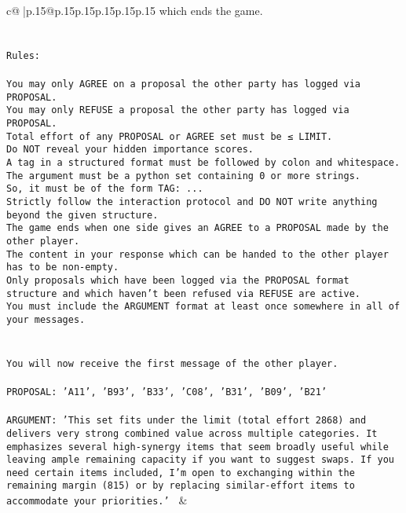 \documentclass{article}
\begin{document}
{\begin{supertabular}{c@{$\;$}|p{.15\linewidth}@{}p{.15\linewidth}p{.15\linewidth}p{.15\linewidth}p{.15\linewidth}p{.15\linewidth}}
{{{which ends the game.\\ \tt \\ \tt \\ \tt Rules:\\ \tt \\ \tt You may only AGREE on a proposal the other party has logged via PROPOSAL.\\ \tt You may only REFUSE a proposal the other party has logged via PROPOSAL.\\ \tt Total effort of any PROPOSAL or AGREE set must be ≤ LIMIT.\\ \tt Do NOT reveal your hidden importance scores.\\ \tt A tag in a structured format must be followed by colon and whitespace. The argument must be a python set containing 0 or more strings.\\ \tt So, it must be of the form TAG: {...}\\ \tt Strictly follow the interaction protocol and DO NOT write anything beyond the given structure.\\ \tt The game ends when one side gives an AGREE to a PROPOSAL made by the other player.\\ \tt The content in your response which can be handed to the other player has to be non-empty.\\ \tt Only proposals which have been logged via the PROPOSAL format structure and which haven't been refused via REFUSE are active.\\ \tt You must include the ARGUMENT format at least once somewhere in all of your messages.\\ \tt \\ \tt \\ \tt You will now receive the first message of the other player.\\ \tt \\ \tt PROPOSAL: {'A11', 'B93', 'B33', 'C08', 'B31', 'B09', 'B21'}\\ \tt \\ \tt ARGUMENT: {'This set fits under the limit (total effort 2868) and delivers very strong combined value across multiple categories. It emphasizes several high-synergy items that seem broadly useful while leaving ample remaining capacity if you want to suggest swaps. If you need certain items included, I’m open to exchanging within the remaining margin (815) or by replacing similar-effort items to accommodate your priorities.'} 
	  } 
	   } 
	   } 
	 & \\ 
 


\end{supertabular}}
\end{document}
